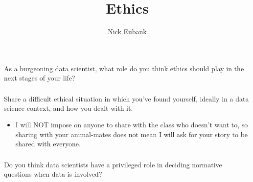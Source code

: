 \documentclass[12pt]{beamer}
\title{Ethics}
\author{Nick Eubank}
\date{\vspace*{.3in} \date}
\begin{document}

\begin{frame}[c]{}
    \titlepage
\end{frame}
\begin{frame}
    \frametitle{}
As a burgeoning data scientist, what role do you think ethics should play in the next stages of your life?
\end{frame}

\begin{frame}
    \frametitle{}
Share a difficult ethical situation in which you've found yourself, ideally in a data science context, and how you dealt with it. \\
\begin{itemize}
    \item I will NOT impose on anyone to share with the class who doesn't want to, so sharing with your animal-mates does not mean I will ask for your story to be shared with everyone.
\end{itemize}
\end{frame}


\begin{frame}
    \frametitle{}
Do you think data scientists have a privileged role in deciding normative questions when data is involved?
\end{frame}
\end{document}
